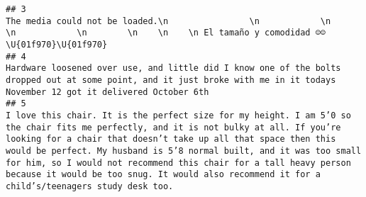 \documentclass[
]{article}
\begin{document}
\begin{verbatim}
## 3                                                                                                                                                                                                                                                                                                                                                                                                                                                                                                                                                                                                                                                                                                                        The media could not be loaded.\n                \n            \n                \n            \n        \n    \n    \n El tamaño y comodidad ☺️☺️\U{01f970}\U{01f970}
## 4                                                                                                                                                                                                                                                                                                                                                                                                                                                                                                                                                                                                                                                                                                              Hardware loosened over use, and little did I know one of the bolts dropped out at some point, and it just broke with me in it todays November 12 got it delivered October 6th
## 5                                                                                                                                                                                                                                                                                                                                                                                                                                     I love this chair. It is the perfect size for my height. I am 5’0 so the chair fits me perfectly, and it is not bulky at all. If you’re looking for a chair that doesn’t take up all that space then this would be perfect. My husband is 5’8 normal built, and it was too small for him, so I would not recommend this chair for a tall heavy person because it would be too snug. It would also recommend it for a child’s/teenagers study desk too.

\end{verbatim}
\end{document}
